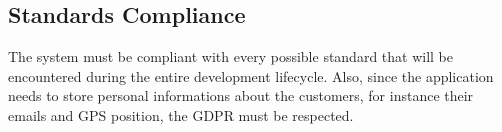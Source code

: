 \subsection{Standards Compliance}

The system must be compliant with every possible standard that will be encountered during the entire development lifecycle. Also, since the application needs to store personal informations about the customers, for instance their emails and GPS position, the GDPR must be respected. 

 
 